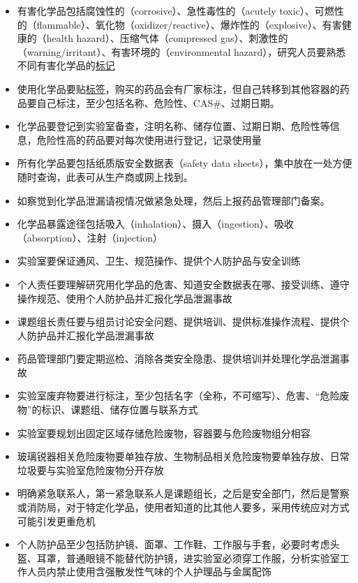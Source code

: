 \documentclass[]{tufte-book}
\providecommand{\tightlist}{%
  \setlength{\itemsep}{0pt}\setlength{\parskip}{0pt}}
\begin{document}
\begin{itemize}
\tightlist
\item
  有害化学品包括腐蚀性的（corrosive）、急性毒性的（acutely toxic）、可燃性的（flammable）、氧化物（oxidizer/reactive）、爆炸性的（explosive）、有害健康的（health hazard）、压缩气体（compressed gas）、刺激性的（warning/irritant）、有害环境的（environmental hazard），研究人员要熟悉不同有害化学品的\href{https://i.loli.net/2020/10/03/2e1CVSz9OIDpoc5.png}{标记}
\item
  使用化学品要贴\href{https://i.loli.net/2020/10/03/2e1CVSz9OIDpoc5.png}{标签}，购买的药品会有厂家标注，但自己转移到其他容器的药品要自己标注，至少包括名称、危险性、CAS\#、过期日期。
\item
  化学品要登记到实验室备查，注明名称、储存位置、过期日期、危险性等信息，危险性高的药品要对每次使用进行登记，记录使用量
\item
  所有化学品要包括纸质版安全数据表（safety data sheets），集中放在一处方便随时查询，此表可从生产商或网上找到。
\item
  如察觉到化学品泄漏请视情况做紧急处理，然后上报药品管理部门备案。
\item
  化学品暴露途径包括吸入（inhalation）、摄入（ingestion）、吸收（absorption）、注射（injection）
\item
  实验室要保证通风、卫生、规范操作、提供个人防护品与安全训练
\item
  个人责任要理解研究用化学品的危害、知道安全数据表在哪、接受训练、遵守操作规范、使用个人防护品并汇报化学品泄漏事故
\item
  课题组长责任要与组员讨论安全问题、提供培训、提供标准操作流程、提供个人防护品并汇报化学品泄漏事故
\item
  药品管理部门要定期巡检、消除各类安全隐患、提供培训并处理化学品泄漏事故
\item
  实验室废弃物要进行标注，至少包括名字（全称，不可缩写）、危害、``危险废物''的标识、课题组、储存位置与联系方式
\item
  实验室要规划出固定区域存储危险废物，容器要与危险废物组分相容
\item
  玻璃锐器相关危险废物要单独存放、生物制品相关危险废物要单独存放、日常垃圾要与实验室危险废物分开存放
\item
  明确紧急联系人，第一紧急联系人是课题组长，之后是安全部门，然后是警察或消防局，对于特定化学品，使用者知道的比其他人要多，采用传统应对方式可能引发更重危机
\item
  个人防护品至少包括防护镜、面罩、工作鞋、工作服与手套，必要时考虑头盔、耳罩，普通眼镜不能替代防护镜，进实验室必须穿工作服，分析实验室工作人员内禁止使用含强散发性气味的个人护理品与金属配饰
\end{itemize}
\end{document}
